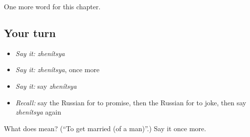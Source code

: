 \begin{grammarlens}[title={What you've built}]
One more word for this chapter.
\end{grammarlens}

\subsection*{Your turn}
\begin{itemize}
\raggedright
  \item \emph{Say it:} \emph{zhenítsya}
  \item \emph{Say it:} \emph{zhenítsya}, once more
  \item \emph{Say it:} say \emph{zhenítsya}
  \item \emph{Recall:} say the Russian for to promise, then the Russian for to joke, then say \emph{zhenítsya} again
\end{itemize}

\begin{tcolorbox}[breakable,colback=teal!4,colframe=teal!35!black,title={Before you move on}]
What does  mean? (\textquotedblleft{}To get married (of a man)\textquotedblright{}.) Say it once more.
\end{tcolorbox}
